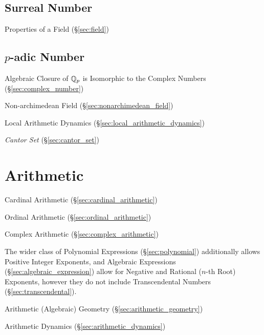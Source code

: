 \subsection{Surreal Number}\label{sec:surreal_number}

Properties of a Field (\S\ref{sec:field})



\subsection{$p$-adic Number}\label{sec:padic_number}

Algebraic Closure of $\mathbb{Q}_p$ is Isomorphic to the Complex Numbers
(\S\ref{sec:complex_number})

Non-archimedean Field (\S\ref{sec:nonarchimedean_field})

Local Arithmetic Dynamics (\S\ref{sec:local_arithmetic_dynamics})

\emph{Cantor Set} (\S\ref{sec:cantor_set})



\section{Arithmetic}\label{sec:arithmetic}

Cardinal Arithmetic (\S\ref{sec:cardinal_arithmetic})

Ordinal Arithmetic (\S\ref{sec:ordinal_arithmetic})

Complex Arithmetic (\S\ref{sec:complex_arithmetic})

The wider class of Polynomial Expressions (\S\ref{sec:polynomial}) additionally
allows Positive Integer Exponents, and Algebraic Expressions
(\S\ref{sec:algebraic_expression}) allow for Negative and Rational ($n$-th
Root) Exponents, however they do not include Transcendental Numbers
(\S\ref{sec:transcendental}).

\fist Arithmetic (Algebraic) Geometry (\S\ref{sec:arithmetic_geometry})

\fist Arithmetic Dynamics (\S\ref{sec:arithmetic_dynamics})


